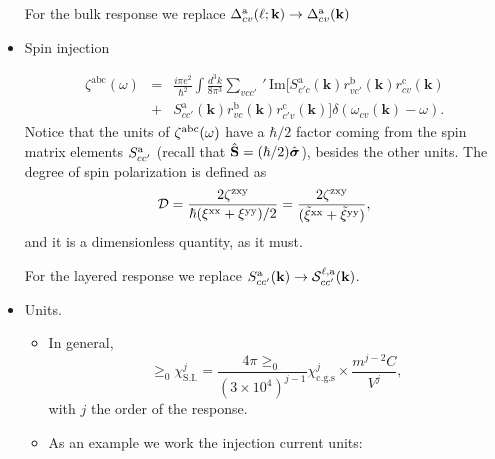 \documentclass[openany,oneside]{book}
\numberwithin{equation}{section}
\begin{document}
\begin{itemize}
For the bulk response we replace 
$\Delta_{cv}^{\mathrm{a}}(\ell;\mathbf{k}) \to \Delta_{cv}^{\mathrm{a}}(\mathbf{k})$

\item Spin injection

\begin{eqnarray*}\label{zetaabci}
\zeta^{\mathrm{abc}}(\omega)
&=&
\frac{i\pi e^2}{\hbar^2}
\int\frac{d^3k}{8\pi^3}
\sum_{vcc'}\,'\,
\mathrm{Im}\Big[S^{\mathrm{a}}_{c'c}(\mathbf{k}) r^{\mathrm{b}}_{vc'}(\mathbf{k}) r^{\mathrm{c}}_{cv}(\mathbf{k})
\nonumber\\
&+& 
S^{\mathrm{a}}_{cc'}(\mathbf{k}) r^{\mathrm{b}}_{vc}(\mathbf{k}) r^{\mathrm{c}}_{c'v}(\mathbf{k})\Big]
\delta(\omega_{cv}(\mathbf{k})-\omega)
.
\end{eqnarray*}  
Notice that the units of $\zeta^{\mathrm{a}\mathrm{b}\mathrm{c}}(\omega)$ have a $\hbar/2$
factor coming from the spin matrix elements $S^{\mathrm{a}}_{cc'}$ (recall
that
$\hat {\mathbf{S}}=(\hbar/2)\hat{\boldsymbol{\sigma}}$), besides the other units.
The degree of spin polarization is defined as
\begin{equation}\label{dps}
{\cal
  D}=\frac{2\zeta^{\mathrm{z}\mathrm{x}\mathrm{y}}}{\hbar(\xi^{\mathrm{x}\mathrm{x}}+\xi^{\mathrm{y}\mathrm{y}})/2}
=\frac{2\zeta^{\mathrm{z}\mathrm{x}\mathrm{y}}}{(\tilde\xi^{\mathrm{x}\mathrm{x}}+\tilde\xi^{\mathrm{y}\mathrm{y}})}
,\nonumber
\end{equation}    
and it is a dimensionless quantity, as it must. 

For the layered response we replace $S^{\mathrm{a}}_{cc'}(\mathbf{k})\to {\cal S}^{\ell,\mathrm{a}}_{cc'}(\mathbf{k})$. 

\item Units. 
\begin{itemize}

\item In general, 
\begin{equation*}\label{si}
\ge_0\chi_{\mathrm{S.I.}}^{j}=\frac{4\pi\ge_0}{(3\times
 10^4)^{j-1}}\chi^{j}_{\mathrm{c.g.s}} \times \frac{m^{j-2}C}{V^j}
,
\end{equation*} 
with $j$ the order of the response. 

\item As an example we work the injection current units:


\end{itemize}
\end{itemize}
\end{document}
